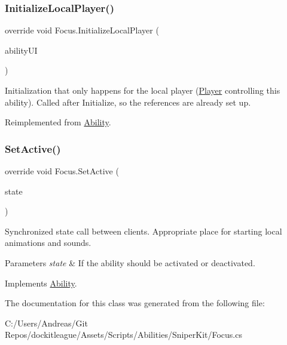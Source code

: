 \subsubsection{\texorpdfstring{Initialize\+Local\+Player()}{InitializeLocalPlayer()}}
{\footnotesize\ttfamily override void Focus.\+Initialize\+Local\+Player (\begin{DoxyParamCaption}\item[{\hyperlink{class_ability_u_i}{Ability\+UI}}]{ability\+UI }\end{DoxyParamCaption})\hspace{0.3cm}{\ttfamily [virtual]}}



Initialization that only happens for the local player (\hyperlink{class_player}{Player} controlling this ability). Called after Initialize, so the references are already set up. 



Reimplemented from \hyperlink{class_ability_ae8217a23a940c9ce450e827856d7020b}{Ability}.

\hypertarget{class_focus_a18fae926f032d411999b668df6ee1d01}{}\label{class_focus_a18fae926f032d411999b668df6ee1d01} 
\subsubsection{\texorpdfstring{Set\+Active()}{SetActive()}}
{\footnotesize\ttfamily override void Focus.\+Set\+Active (\begin{DoxyParamCaption}\item[{bool}]{state }\end{DoxyParamCaption})\hspace{0.3cm}{\ttfamily [virtual]}}



Synchronized state call between clients. Appropriate place for starting local animations and sounds. 


\begin{DoxyParams}{Parameters}
{\em state} & If the ability should be activated or deactivated.\\
\hline
\end{DoxyParams}


Implements \hyperlink{class_ability_a10f7f3c2b63eeef6e352aee48d246384}{Ability}.



The documentation for this class was generated from the following file\+:\begin{DoxyCompactItemize}
\item 
C\+:/\+Users/\+Andreas/\+Git Repos/dockitleague/\+Assets/\+Scripts/\+Abilities/\+Sniper\+Kit/Focus.\+cs\end{DoxyCompactItemize}
